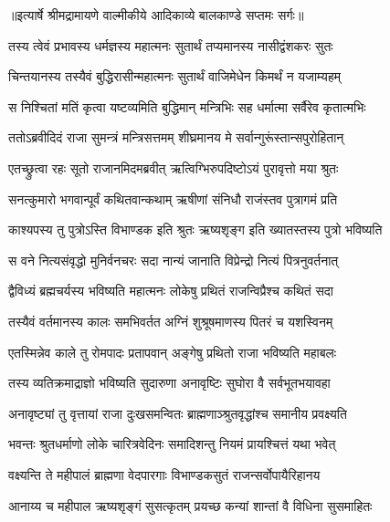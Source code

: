 {॥इत्यार्षे श्रीमद्रामायणे वाल्मीकीये आदिकाव्ये बालकाण्डे सप्तमः सर्गः॥}


\twolineshloka
{तस्य त्वेवं प्रभावस्य धर्मज्ञस्य महात्मनः}
{सुतार्थं तप्यमानस्य नासीद्वंशकरः सुतः} %

\twolineshloka
{चिन्तयानस्य तस्यैवं बुद्धिरासीन्महात्मनः}
{सुतार्थं वाजिमेधेन किमर्थं न यजाम्यहम्} %

\twolineshloka
{स निश्चितां मतिं कृत्वा यष्टव्यमिति बुद्धिमान्}
{मन्त्रिभिः सह धर्मात्मा सर्वैरेव कृतात्मभिः} %

\twolineshloka
{ततोऽब्रवीदिदं राजा सुमन्त्रं मन्त्रिसत्तमम्}
{शीघ्रमानय मे सर्वान्गुरूंस्तान्सपुरोहितान्} %

\twolineshloka
{एतच्छ्रुत्वा रहः सूतो राजानमिदमब्रवीत्}
{ऋत्विग्भिरुपदिष्टोऽयं पुरावृत्तो मया श्रुतः} %

\twolineshloka
{सनत्कुमारो भगवान्पूर्वं कथितवान्कथाम्}
{ऋषीणां संनिधौ राजंस्तव पुत्रागमं प्रति} %

\twolineshloka
{काश्यपस्य तु पुत्रोऽस्ति विभाण्डक इति श्रुतः}
{ऋष्यशृङ्ग इति ख्यातस्तस्य पुत्रो भविष्यति} %

\twolineshloka
{स वने नित्यसंवृद्धो मुनिर्वनचरः सदा}
{नान्यं जानाति विप्रेन्द्रो नित्यं पित्रनुवर्तनात्} %

\twolineshloka
{द्वैविध्यं ब्रह्मचर्यस्य भविष्यति महात्मनः}
{लोकेषु प्रथितं राजन्विप्रैश्च कथितं सदा} %

\twolineshloka
{तस्यैवं वर्तमानस्य कालः समभिवर्तत}
{अग्निं शुश्रूषमाणस्य पितरं च यशस्विनम्} %

\twolineshloka
{एतस्मिन्नेव काले तु रोमपादः प्रतापवान्}
{अङ्गेषु प्रथितो राजा भविष्यति महाबलः} %

\twolineshloka
{तस्य व्यतिक्रमाद्राज्ञो भविष्यति सुदारुणा}
{अनावृष्टिः सुघोरा वै सर्वभूतभयावहा} %

\twolineshloka
{अनावृष्ट्यां तु वृत्तायां राजा दुःखसमन्वितः}
{ब्राह्मणाञ्श्रुतवृद्धांश्च समानीय प्रवक्ष्यति} %

\twolineshloka
{भवन्तः श्रुतधर्माणो लोके चारित्रवेदिनः}
{समादिशन्तु नियमं प्रायश्चित्तं यथा भवेत्} %

\twolineshloka
{वक्ष्यन्ति ते महीपालं ब्राह्मणा वेदपारगाः}
{विभाण्डकसुतं राजन्सर्वोपायैरिहानय} %

\twolineshloka
{आनाय्य च महीपाल ऋष्यशृङ्गं सुसत्कृतम्}
{प्रयच्छ कन्यां शान्तां वै विधिना सुसमाहितः} %

